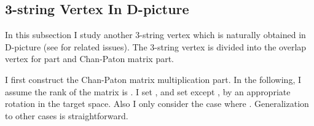 \documentclass[a4paper,12pt]{article}
\providecommand{\XD}{X_D}
\begin{document}
\subsection{3-string Vertex %
In D-picture}

In this subsection I study
another 3-string vertex which is 
naturally obtained in D-picture
(see \cite{Klu} for related issues).
The 3-string vertex is divided into
the overlap vertex
for \myHighlight{$\XD^i(\sigma)$}\coordHE{} part 
and Chan-Paton matrix part.

I first construct the
Chan-Paton matrix multiplication part.
In the following, I assume the rank of
the matrix \coordHE{} is \coordHE{}. 
I set \coordHE{},
and set \coordHE{} except
\coordHE{},
by an appropriate rotation in the target space.
Also I only consider the case where
\coordHE{}.
Generalization to other
cases is straightforward.
\end{document}
